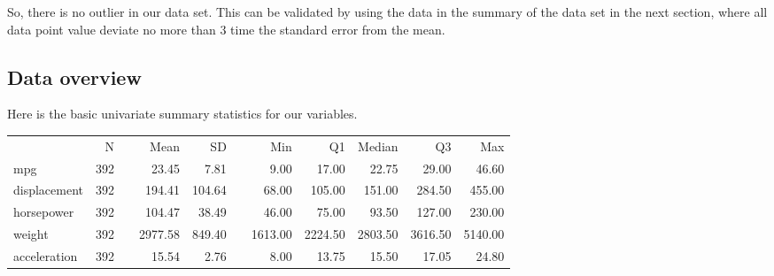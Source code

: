 So, there is no outlier in our data set. This can be validated by using the data in the summary of the data set in the next section, where all data point value deviate no more than 3 time the standard error from the mean.

\subsection{Data overview}

Here is the basic univariate summary statistics for our variables. 

\begin{center}
\begin{minipage}{\linewidth}
\begin{center}
\begin{tabular}{lrrrrrrrrrr}
  \toprule
   & N &   & Mean & SD &   & Min & Q1 & Median & Q3 & Max \\ 
    \cmidrule{2-2}  \cmidrule{4-5} \cmidrule{7-11}
  mpg & 392 &  & 23.45 & 7.81 &  & 9.00 & 17.00 & 22.75 & 29.00 & 46.60 \\ 
  displacement & 392 &  & 194.41 & 104.64 &  & 68.00 & 105.00 & 151.00 & 284.50 & 455.00 \\ 
  horsepower & 392 &  & 104.47 & 38.49 &  & 46.00 & 75.00 & 93.50 & 127.00 & 230.00 \\ 
  weight & 392 &  & 2977.58 & 849.40 &  & 1613.00 & 2224.50 & 2803.50 & 3616.50 & 5140.00 \\ 
  acceleration & 392 &  & 15.54 & 2.76 &  & 8.00 & 13.75 & 15.50 & 17.05 & 24.80 \\ 
   \bottomrule
\end{tabular}
\end{center}
\end{minipage}
\end{center}

